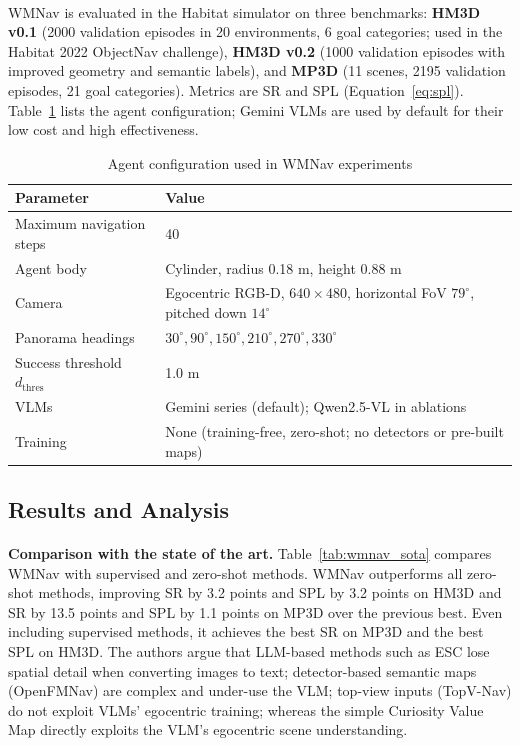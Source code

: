 \documentclass[12pt,a4paper,final]{extreport}
\begin{document}
\paragraph{} WMNav is evaluated in the Habitat simulator on three benchmarks: \textbf{HM3D v0.1} (2000 validation episodes in 20 environments, 6 goal categories; used in the Habitat 2022 ObjectNav challenge), \textbf{HM3D v0.2} (1000 validation episodes with improved geometry and semantic labels), and \textbf{MP3D} (11 scenes, 2195 validation episodes, 21 goal categories). Metrics are SR and SPL (Equation~\ref{eq:spl}). Table~\ref{tab:wmnav_setup} lists the agent configuration; Gemini VLMs are used by default for their low cost and high effectiveness.

{\renewcommand{\arraystretch}{1.2}
\begin{table}[htbp]
\centering
\caption{Agent configuration used in WMNav experiments \cite{p4}}\label{tab:wmnav_setup}
\small
\begin{tabularx}{\textwidth}{|p{5cm}|X|}
\hline
\textbf{Parameter} & \textbf{Value} \\ \hline
Maximum navigation steps & 40 \\ \hline
Agent body & Cylinder, radius 0.18 m, height 0.88 m \\ \hline
Camera & Egocentric RGB-D, $640\times480$, horizontal FoV $79^{\circ}$, pitched down $14^{\circ}$ \\ \hline
Panorama headings & $30^{\circ},90^{\circ},150^{\circ},210^{\circ},270^{\circ},330^{\circ}$ \\ \hline
Success threshold $d_{\mathrm{thres}}$ & 1.0 m \\ \hline
VLMs & Gemini series (default); Qwen2.5-VL in ablations \\ \hline
Training & None (training-free, zero-shot; no detectors or pre-built maps) \\ \hline
\end{tabularx}
\end{table}}

\subsection{Results and Analysis}

\paragraph{} \textbf{Comparison with the state of the art.} Table~\ref{tab:wmnav_sota} compares WMNav with supervised and zero-shot methods. WMNav outperforms all zero-shot methods, improving SR by 3.2 points and SPL by 3.2 points on HM3D and SR by 13.5 points and SPL by 1.1 points on MP3D over the previous best. Even including supervised methods, it achieves the best SR on MP3D and the best SPL on HM3D. The authors argue that LLM-based methods such as ESC lose spatial detail when converting images to text; detector-based semantic maps (OpenFMNav) are complex and under-use the VLM; top-view inputs (TopV-Nav) do not exploit VLMs' egocentric training; whereas the simple Curiosity Value Map directly exploits the VLM's egocentric scene understanding.
\end{document}
